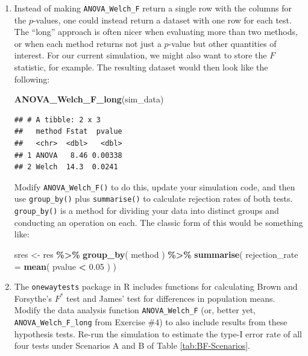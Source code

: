 \documentclass[
]{book}
\newenvironment{Shaded}{\begin{snugshade}}{\end{snugshade}}
\newcommand{\AttributeTok}[1]{\textcolor[rgb]{0.13,0.29,0.53}{#1}}
\newcommand{\FloatTok}[1]{\textcolor[rgb]{0.00,0.00,0.81}{#1}}
\newcommand{\FunctionTok}[1]{\textcolor[rgb]{0.13,0.29,0.53}{\textbf{#1}}}
\newcommand{\NormalTok}[1]{#1}
\newcommand{\OtherTok}[1]{\textcolor[rgb]{0.56,0.35,0.01}{#1}}
\newcommand{\SpecialCharTok}[1]{\textcolor[rgb]{0.81,0.36,0.00}{\textbf{#1}}}
\begin{document}
\begin{enumerate}
\def\labelenumi{\arabic{enumi}.}
\setcounter{enumi}{3}
\item
  Instead of making \texttt{ANOVA\_Welch\_F} return a single row with the columns for the \(p\)-values, one could instead return a dataset with one row for each test. The ``long'' approach is often nicer when evaluating more than two methods, or when each method returns not just a \(p\)-value but other quantities of interest. For our current simulation, we might also want to store the \(F\) statistic, for example. The resulting dataset would then look like the following:

\begin{Shaded}
\begin{Highlighting}[]
\FunctionTok{ANOVA\_Welch\_F\_long}\NormalTok{(sim\_data)}
\end{Highlighting}
\end{Shaded}

\begin{verbatim}
## # A tibble: 2 x 3
##   method Fstat  pvalue
##   <chr>  <dbl>   <dbl>
## 1 ANOVA   8.46 0.00338
## 2 Welch  14.3  0.0241
\end{verbatim}

  Modify \texttt{ANOVA\_Welch\_F()} to do this, update your simulation code, and then use \texttt{group\_by()} plus \texttt{summarise()} to calculate rejection rates of both tests. \texttt{group\_by()} is a method for dividing your data into distinct groups and conducting an operation on each. The classic form of this would be something like:

\begin{Shaded}
\begin{Highlighting}[]
\NormalTok{sres }\OtherTok{\textless{}{-}}\NormalTok{ res }\SpecialCharTok{\%\textgreater{}\%} \FunctionTok{group\_by}\NormalTok{( method ) }\SpecialCharTok{\%\textgreater{}\%}
  \FunctionTok{summarise}\NormalTok{( }\AttributeTok{rejection\_rate =} \FunctionTok{mean}\NormalTok{( pvalue }\SpecialCharTok{\textless{}} \FloatTok{0.05}\NormalTok{ ) )}
\end{Highlighting}
\end{Shaded}
\item
  The \texttt{onewaytests} package in R includes functions for calculating Brown and Forsythe's \(F^*\) test and James' test for differences in population means. Modify the data analysis function \texttt{ANOVA\_Welch\_F} (or, better yet, \texttt{ANOVA\_Welch\_F\_long} from Exercise \#4) to also include results from these hypothesis tests. Re-run the simulation to estimate the type-I error rate of all four tests under Scenarios A and B of Table \ref{tab:BF-Scenarios}.
\end{enumerate}
\end{document}
